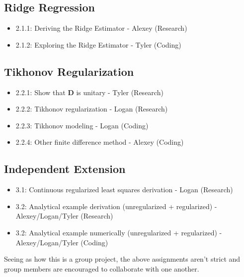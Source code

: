 \documentclass{article}
\begin{document}
    \subsection{Ridge Regression}

    \begin{itemize}
        \item 2.1.1: Deriving the Ridge Estimator - Alexey (Research)
        \item 2.1.2: Exploring the Ridge Estimator - Tyler (Coding)
    \end{itemize}

    \subsection{Tikhonov Regularization}

    \begin{itemize}
        \item 2.2.1: Show that $\textbf{D}$ is unitary - Tyler (Research)
        \item 2.2.2: Tikhonov regularization - Logan (Research)
        \item 2.2.3: Tikhonov modeling - Logan (Coding)
        \item 2.2.4: Other finite difference method - Alexey (Coding)
    \end{itemize}

    \subsection{Independent Extension}

    \begin{itemize}
        \item 3.1: Continuous regularized least squares derivation - Logan (Research)
        \item 3.2: Analytical example derivation (unregularized + regularized) - Alexey/Logan/Tyler (Research)
        \item 3.2: Analytical example numerically (unregularized + regularized) - Alexey/Logan/Tyler (Coding)
    \end{itemize}

    Seeing as how this is a group project, the above assignments aren't strict and group members are encouraged to collaborate with one another.
\end{document}
